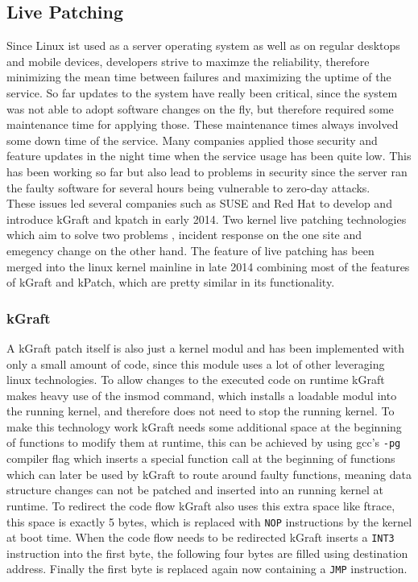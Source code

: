\documentclass{sig-alternate-05-2015}
\begin{document}
\subsection{Live Patching}
Since Linux ist used as a server operating system as well as on regular desktops and mobile devices, developers strive to maximze the reliability, therefore minimizing the mean time between failures and maximizing the uptime of the service. So far updates to the system have really been critical, since the system was not able to adopt software changes on the fly, but therefore required some maintenance time for applying those. These maintenance times always involved some down time of the service. Many companies applied those security and feature updates in the night time when the service usage has been quite low. This has been working so far but also lead to problems in security since the server ran the faulty software for several hours being vulnerable to zero-day attacks. \\
These issues led several companies such as SUSE and Red Hat to develop and introduce kGraft and kpatch in early 2014. Two kernel live patching technologies which aim to solve two problems \cite{kgraft-1}, incident response on the one site and emegency change on the other hand. The feature of live patching has been merged into the linux kernel mainline in late 2014 combining most of the features of kGraft and kPatch, which are pretty similar in its functionality.

\subsubsection{kGraft}
A kGraft patch itself is also just a kernel modul and has been implemented with only a small amount of code, since this module uses a lot of other leveraging linux technologies. To allow changes to the executed code on runtime kGraft makes heavy use of the insmod command, which installs a loadable modul into the running kernel, and therefore does not need to stop the running kernel. To make this technology work kGraft needs some additional space at the beginning of functions to modify them at runtime, this can be achieved by using gcc's \texttt{-pg} compiler flag which inserts a special function call at the beginning of functions which can later be used by kGraft to route around faulty functions, meaning data structure changes can not be patched and inserted into an running kernel at runtime. To redirect the code flow kGraft also uses this extra space like ftrace, this space is exactly 5 bytes, which is replaced with \texttt{NOP} instructions by the kernel at boot time. When the code flow needs to be redirected kGraft inserts a \texttt{INT3} instruction into the first byte, the following four bytes are filled using destination address. Finally the first byte is replaced again now containing a \texttt{JMP} instruction.
\end{document}
